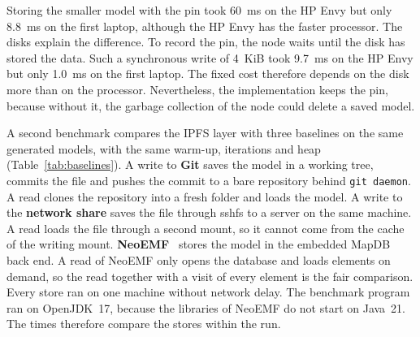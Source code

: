 \documentclass[5p,times,twocolumn]{elsarticle}
\theoremstyle{definition}
\theoremstyle{plain}
\begin{document}
Storing the smaller model with the pin took 60~ms on the HP Envy but only 8.8~ms on the first laptop, although the HP Envy has the faster processor. The disks explain the difference. To record the pin, the node waits until the disk has stored the data. Such a synchronous write of 4~KiB took 9.7~ms on the HP Envy but only 1.0~ms on the first laptop. The fixed cost therefore depends on the disk more than on the processor. Nevertheless, the implementation keeps the pin, because without it, the garbage collection of the node could delete a saved model.

A second benchmark compares the IPFS layer with three baselines on the same generated models, with the same warm-up, iterations and heap (Table~\ref{tab:baselines}). A write to \textbf{Git} saves the model in a working tree, commits the file and pushes the commit to a bare repository behind \texttt{git daemon}. A read clones the repository into a fresh folder and loads the model. A write to the \textbf{network share} saves the file through sshfs to a server on the same machine. A read loads the file through a second mount, so it cannot come from the cache of the writing mount. \textbf{NeoEMF}~\cite{daniel2017neoemf} stores the model in the embedded MapDB back end. A read of NeoEMF only opens the database and loads elements on demand, so the read together with a visit of every element is the fair comparison. Every store ran on one machine without network delay. The benchmark program ran on OpenJDK~17, because the libraries of NeoEMF do not start on Java~21. The times therefore compare the stores within the run.
\end{document}
